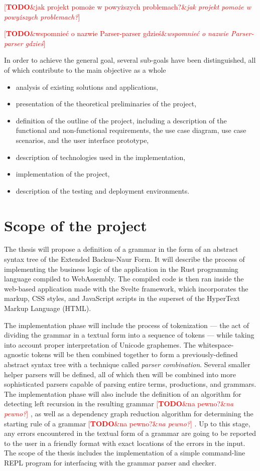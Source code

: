 \documentclass[english,engineering]{wizthesis}
\newcommand{\todo}[1]{%
  \textcolor{red}{[\textbf{TODO}\ifx&#1&{}\else{ }\fi\emph{#1}]}%
}
\newcommand{\thisproject}{Parser-parser}
\begin{document}
\todo{jak projekt pomoże w powyższych problemach?}

\todo{wspomnieć o nazwie \thisproject{} gdzieś}

In order to achieve the general goal, several sub-goals have been
distinguished, all of which contribute to the main objective as a whole
\begin{itemize}
  \item analysis of existing solutions and applications,
  \item presentation of the theoretical preliminaries of the project,
  \item definition of the outline of the project, including a description of the
  functional and non-functional requirements, the use case diagram, use case
  scenarios, and the user interface prototype,
  \item description of technologies used in the implementation,
  \item implementation of the project,
  \item description of the testing and deployment environments.
\end{itemize}

\section{Scope of the project}

The thesis will propose a definition of a grammar in the form of an abstract
syntax tree of the Extended Backus-Naur Form. It will describe the process of
implementing the business logic of the application in the Rust programming
language compiled to WebAssembly. The compiled code is then ran inside the
web-based application made with the Svelte framework, which incorporates the
markup, CSS styles, and JavaScript scripts in the superset of the HyperText
Markup Language (HTML).

The implementation phase will include the process of tokenization --- the act of
dividing the grammar in a textual form into a sequence of tokens --- while
taking into account proper interpretation of Unicode graphemes. The
whitespace-agnostic tokens will be then combined together to form a
previously-defined abstract syntax tree with a technique called \emph{parser
combination}. Several smaller helper parsers will be defined, all of which then
will be combined into more sophisticated parsers capable of parsing entire
terms, productions, and grammars. The implementation phase will also include the
definition of an algorithm for detecting left recursion in the resulting grammar
\todo{na pewno?}, as well as a dependency graph reduction algorithm for
determining the starting rule of a grammar \todo{na pewno?}. Up to this stage,
any errors encountered in the textual form of a grammar are going to be reported
to the user in a friendly format with exact locations of the errors in the
input. The scope of the thesis includes the implementation of a simple
command-line REPL program for interfacing with the grammar parser and checker.
\end{document}
